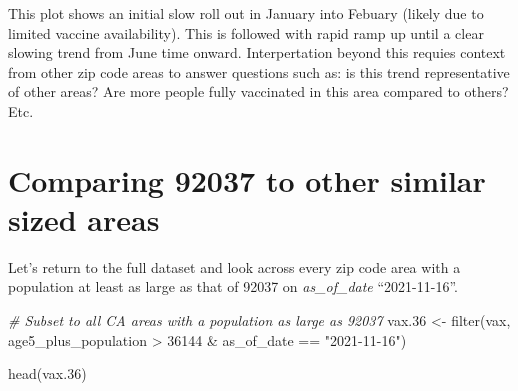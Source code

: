 \documentclass[
]{article}
\newenvironment{Shaded}{\begin{snugshade}}{\end{snugshade}}
\newcommand{\CommentTok}[1]{\textcolor[rgb]{0.56,0.35,0.01}{\textit{#1}}}
\newcommand{\DecValTok}[1]{\textcolor[rgb]{0.00,0.00,0.81}{#1}}
\newcommand{\FloatTok}[1]{\textcolor[rgb]{0.00,0.00,0.81}{#1}}
\newcommand{\FunctionTok}[1]{\textcolor[rgb]{0.00,0.00,0.00}{#1}}
\newcommand{\NormalTok}[1]{#1}
\newcommand{\OtherTok}[1]{\textcolor[rgb]{0.56,0.35,0.01}{#1}}
\newcommand{\SpecialCharTok}[1]{\textcolor[rgb]{0.00,0.00,0.00}{#1}}
\newcommand{\StringTok}[1]{\textcolor[rgb]{0.31,0.60,0.02}{#1}}
\begin{document}
This plot shows an initial slow roll out in January into Febuary (likely
due to limited vaccine availability). This is followed with rapid ramp
up until a clear slowing trend from June time onward. Interpertation
beyond this requies context from other zip code areas to answer
questions such as: is this trend representative of other areas? Are more
people fully vaccinated in this area compared to others? Etc.

\hypertarget{comparing-92037-to-other-similar-sized-areas}{%
\section{Comparing 92037 to other similar sized
areas}\label{comparing-92037-to-other-similar-sized-areas}}

Let's return to the full dataset and look across every zip code area
with a population at least as large as that of 92037 on
\emph{as\_of\_date} ``2021-11-16''.

\begin{Shaded}
\begin{Highlighting}[]
\CommentTok{\# Subset to all CA areas with a population as large as 92037}
\NormalTok{vax}\FloatTok{.36} \OtherTok{\textless{}{-}} \FunctionTok{filter}\NormalTok{(vax, age5\_plus\_population }\SpecialCharTok{\textgreater{}} \DecValTok{36144} \SpecialCharTok{\&}
\NormalTok{                   as\_of\_date }\SpecialCharTok{==} \StringTok{"2021{-}11{-}16"}\NormalTok{)}

\FunctionTok{head}\NormalTok{(vax}\FloatTok{.36}\NormalTok{)}
\end{Highlighting}
\end{Shaded}
\end{document}
